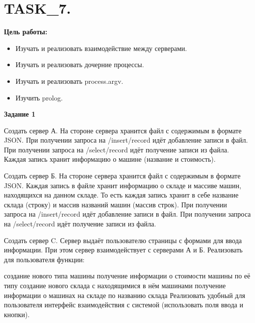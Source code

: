 \chapter{TASK\_7.}

\textbf{Цель работы:}

\begin{itemize} 
	\item Изучать и реализовать взаимодействие между серверами.
	\item Изучать и реализовать дочерние процессы.
	\item Изучать и реализовать process.argv.
	\item Изучить prolog.
\end{itemize}


\textbf{Задание 1}

Создать сервер А. На стороне сервера хранится файл с содержимым в формате JSON. При получении запроса на /insert/record идёт добавление записи в файл. При получении запроса на /select/record идёт получение записи из файла. Каждая запись хранит информацию о машине (название и стоимость).

Создать сервер Б. На стороне сервера хранится файл с содержимым в формате JSON. Каждая запись в файле хранит информацию о складе и массиве машин, находящихся на данном складе. То есть каждая запись хранит в себе название склада (строку) и массив названий машин (массив строк). При получении запроса на /insert/record идёт добавление записи в файл. При получении запроса на /select/record идёт получение записи из файла.

Создать сервер C. Сервер выдаёт пользователю страницы с формами для ввода информации. При этом сервер взаимодействует с серверами А и Б. Реализовать для пользователя функции:

создание нового типа машины
получение информации о стоимости машины по её типу
создание нового склада с находящимися в нём машинами
получение информации о машинах на складе по названию склада
Реализовать удобный для пользователя интерфейс взаимодействия с системой (использовать поля ввода и кнопки).


